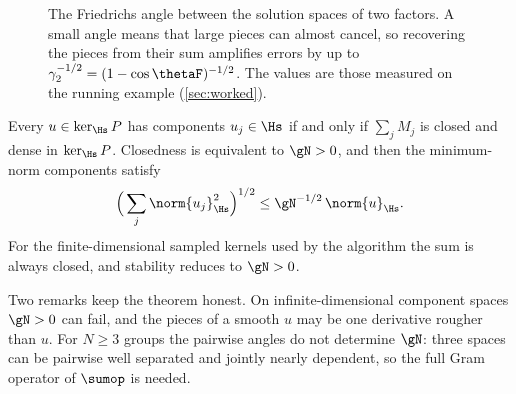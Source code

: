 \begin{figure}[tbp]
\centering
{}
\caption{The Friedrichs angle between the solution spaces of two factors. A small angle means that large pieces can
almost cancel, so recovering the pieces from their sum amplifies errors by up to $\gamma_2^{-1/2}=(1-\cos\thetaF)^{-1/2}$.
The values are those measured on the running example (\cref{sec:worked}).}\label{fig:friedrichs}
\end{figure}

\begin{theorem}\label{thm:hm}
Every $u\in\ker_{\Hs}P$ has components $u_j\in\Hs$ if and only if $\sum_jM_j$ is closed and dense in $\ker_{\Hs}P$.
Closedness is equivalent to $\gN>0$, and then the minimum-norm components satisfy
\begin{equation}\label{eq:hm}
  \Big(\sum_j\norm{u_j}_{\Hs}^2\Big)^{1/2}\le\gN^{-1/2}\,\norm{u}_{\Hs}.
\end{equation}
For the finite-dimensional sampled kernels used by the algorithm the sum is always closed, and stability reduces to
$\gN>0$.
\end{theorem}

Two remarks keep the theorem honest. On infinite-dimensional component spaces $\gN>0$ can fail, and the pieces of a
smooth $u$ may be one derivative rougher than $u$. For $N\ge3$ groups the pairwise angles do not determine $\gN$: three
spaces can be pairwise well separated and jointly nearly dependent, so the full Gram operator of $\sumop$ is needed.


